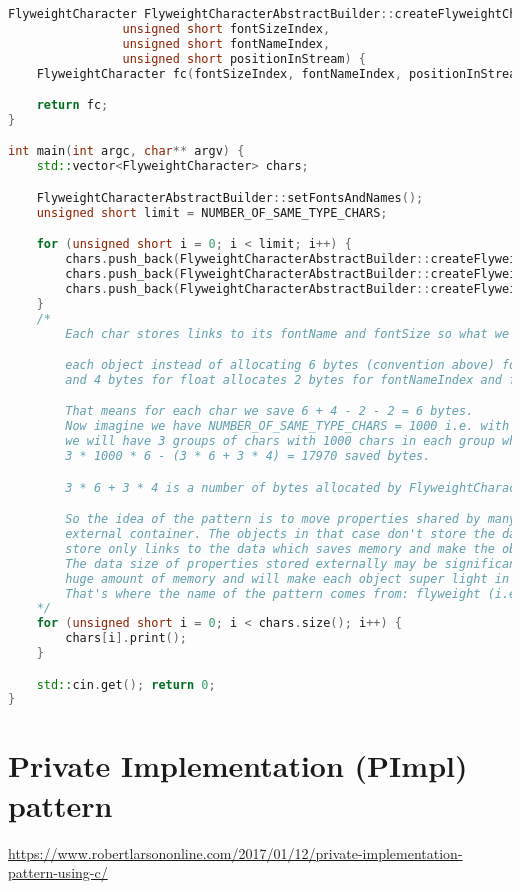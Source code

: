 \documentclass{book}
\newcounter{subpart}
\begin{document}
\begin{lstlisting}[caption={Flyweight Pattern sample 2},language=C++]
FlyweightCharacter FlyweightCharacterAbstractBuilder::createFlyweightCharacter(
                unsigned short fontSizeIndex,
                unsigned short fontNameIndex, 
                unsigned short positionInStream) {
	FlyweightCharacter fc(fontSizeIndex, fontNameIndex, positionInStream);

	return fc;
}

int main(int argc, char** argv) {
	std::vector<FlyweightCharacter> chars;

	FlyweightCharacterAbstractBuilder::setFontsAndNames();
	unsigned short limit = NUMBER_OF_SAME_TYPE_CHARS;

	for (unsigned short i = 0; i < limit; i++) {
		chars.push_back(FlyweightCharacterAbstractBuilder::createFlyweightCharacter(0, 0, i));
		chars.push_back(FlyweightCharacterAbstractBuilder::createFlyweightCharacter(1, 1, i + 1 * limit));
		chars.push_back(FlyweightCharacterAbstractBuilder::createFlyweightCharacter(2, 2, i + 2 * limit));
	}
	/*
		Each char stores links to its fontName and fontSize so what we get is:

		each object instead of allocating 6 bytes (convention above) for string
		and 4 bytes for float allocates 2 bytes for fontNameIndex and fontSizeIndex.

		That means for each char we save 6 + 4 - 2 - 2 = 6 bytes.
		Now imagine we have NUMBER_OF_SAME_TYPE_CHARS = 1000 i.e. with our code
		we will have 3 groups of chars with 1000 chars in each group which will save 
		3 * 1000 * 6 - (3 * 6 + 3 * 4) = 17970 saved bytes.

		3 * 6 + 3 * 4 is a number of bytes allocated by FlyweightCharacterAbstractBuilder.

		So the idea of the pattern is to move properties shared by many objects to some
		external container. The objects in that case don't store the data themselves they
		store only links to the data which saves memory and make the objects lighter.
		The data size of properties stored externally may be significant which will save REALLY
		huge amount of memory and will make each object super light in comparison to its counterpart.
		That's where the name of the pattern comes from: flyweight (i.e. very light).
	*/
	for (unsigned short i = 0; i < chars.size(); i++) {
		chars[i].print();
	}

	std::cin.get(); return 0;
}
\end{lstlisting}


\chapter{Private Implementation (PImpl) pattern}\label{pimplpattern}
\url{https://www.robertlarsononline.com/2017/01/12/private-implementation-pattern-using-c/}
\end{document}
